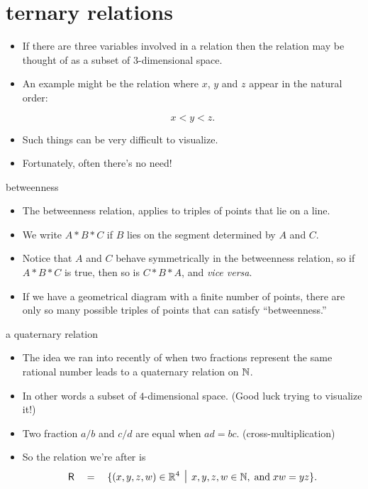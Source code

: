 \documentclass[landscape]{beamer}
\begin{document}
\section{ternary relations}

\begin{frame}{}
\begin{itemize}
\item If there are three variables involved in a relation then the relation may be thought of as a subset of $3$-dimensional space. \pause
\item An example might be the relation where $x$, $y$ and $z$ appear in the natural order:

\[ x < y < z. \]
\pause
\item Such things can be very difficult to visualize. \pause
\item Fortunately, often there's no need!
\end{itemize}
\end{frame}

\begin{frame}{betweenness}
\begin{itemize}
\item The betweenness relation, applies to triples of points that lie on a line. \pause
\item We write $A \ast B \ast C$ if $B$ lies on the segment determined by $A$ and $C$. \pause
\item Notice that $A$ and $C$ behave symmetrically in the betweenness relation, so if 
$A \ast B \ast C$ is true, then so is $C \ast B \ast A$, and {\em vice versa}. \pause
\item If we have a geometrical diagram with a finite number of points, there are only so many possible triples of points that can satisfy ``betweenness.'' 
\end{itemize}
\end{frame}

\begin{frame}{a quaternary relation}
\begin{itemize}
\item The idea we ran into recently of when two fractions represent the same rational number leads to a quaternary relation on ${\mathbb N}$. \pause
\item In other words a subset of $4$-dimensional space. (Good luck trying to visualize it!) \pause
\item Two fraction $a/b$ and $c/d$ are equal when $ad=bc$. (cross-multiplication) \pause
\item So the relation we're after is 
\[ \relR \quad = \quad \{ (x,y,z,w) \in \Reals^4 \; \suchthat \; x,y,z,w \in \Naturals, \; \mbox{and} \; xw=yz \}. \]
\end{itemize}
\end{frame}
\end{document}
